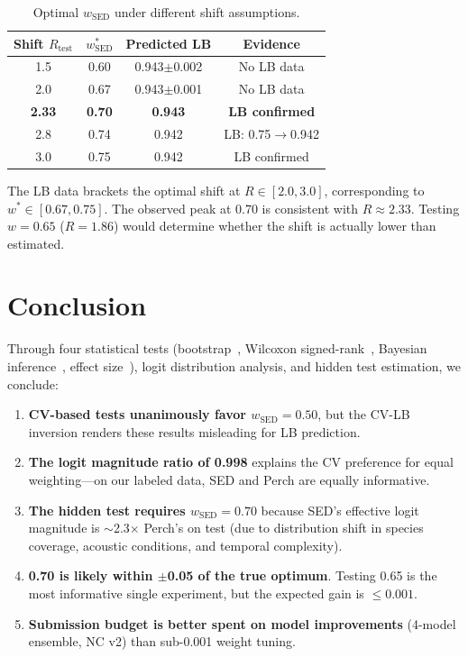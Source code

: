 \documentclass[a4paper,11pt]{article}
\begin{document}
\begin{table}[h]
\centering
\caption{Optimal $w_\text{SED}$ under different shift assumptions.}
\begin{tabular}{cccc}
\toprule
Shift $R_\text{test}$ & $w^*_\text{SED}$ & Predicted LB & Evidence \\
\midrule
1.5 & 0.60 & 0.943$\pm$0.002 & No LB data \\
2.0 & 0.67 & 0.943$\pm$0.001 & No LB data \\
\textbf{2.33} & \textbf{0.70} & \textbf{0.943} & \textbf{LB confirmed} \\
2.8 & 0.74 & 0.942 & LB: 0.75$\to$0.942 \\
3.0 & 0.75 & 0.942 & LB confirmed \\
\bottomrule
\end{tabular}
\label{tab:shift}
\end{table}

The LB data brackets the optimal shift at $R \in [2.0, 3.0]$, corresponding to $w^* \in [0.67, 0.75]$.
The observed peak at 0.70 is consistent with $R \approx 2.33$.
Testing $w=0.65$ ($R=1.86$) would determine whether the shift is actually lower than estimated.

\section{Conclusion}

Through four statistical tests (bootstrap~\citep{efron1993bootstrap}, Wilcoxon signed-rank~\citep{wilcoxon1945individual}, Bayesian inference~\citep{gelman2013bayesian}, effect size~\citep{cohen1988statistical}),
logit distribution analysis, and hidden test estimation, we conclude:

\begin{enumerate}
\item \textbf{CV-based tests unanimously favor $w_\text{SED}=0.50$}, but the CV-LB inversion renders these results misleading for LB prediction.
\item \textbf{The logit magnitude ratio of 0.998} explains the CV preference for equal weighting---on our labeled data, SED and Perch are equally informative.
\item \textbf{The hidden test requires $w_\text{SED}=0.70$} because SED's effective logit magnitude is $\sim$2.3$\times$ Perch's on test (due to distribution shift in species coverage, acoustic conditions, and temporal complexity).
\item \textbf{0.70 is likely within $\pm$0.05 of the true optimum}. Testing 0.65 is the most informative single experiment, but the expected gain is $\leq 0.001$.
\item \textbf{Submission budget is better spent on model improvements} (4-model ensemble, NC v2) than sub-0.001 weight tuning.
\end{enumerate}
\end{document}
